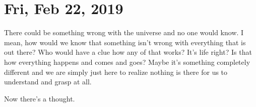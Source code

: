 \section{Fri, Feb 22, 2019}

There could be something wrong with the universe and no one would know.
I mean, how would we know that something isn't wrong with everything
that is out there? Who would have a clue how any of that works? It's
life right? Is that how everything happens and comes and goes? Maybe
it's something completely different and we are simply just here to realize
nothing is there for us to understand and grasp at all.

Now there's a thought.
